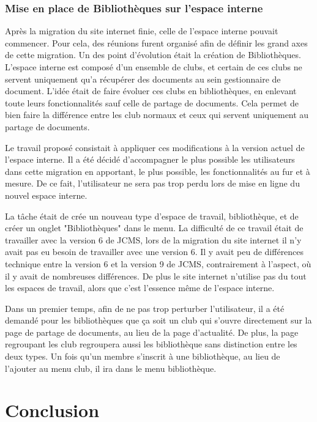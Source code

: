 \documentclass[12pt,a4paper]{article}
\begin{document}
\subsubsection{Mise en place de Bibliothèques sur l'espace interne}
Après la migration du site internet finie, celle de l'espace interne pouvait commencer. Pour cela, des réunions furent organisé afin de définir les grand axes de cette migration. Un des point d'évolution était la création de Bibliothèques. L'espace interne est composé d'un ensemble de clubs, et certain de ces clubs ne servent uniquement qu'a récupérer des documents au sein gestionnaire de document. L'idée était de faire évoluer ces clubs en bibliothèques, en enlevant toute leurs fonctionnalités sauf celle de partage de documents. Cela permet de bien faire la différence entre les club normaux et ceux qui servent uniquement au partage de documents.\par 
Le travail proposé consistait à appliquer ces modifications à la version actuel de l'espace interne. Il a été décidé d'accompagner le plus possible les utilisateurs dans cette migration en apportant, le plus possible, les fonctionnalités au fur et à mesure. De ce fait, l'utilisateur ne sera pas trop perdu lors de mise en ligne du nouvel espace interne.\par 
La tâche était de crée un nouveau type d'espace de travail, bibliothèque, et de créer un onglet "Bibliothèques" dans le menu. La difficulté de ce travail était de travailler avec la version 6 de JCMS, lors de la migration du site internet il n'y avait pas eu besoin de travailler avec une version 6. Il y avait peu de différences technique entre la version 6 et la version 9 de JCMS, contrairement à l'aspect, où il y avait de nombreuses différences. De plus le site internet n'utilise pas du tout les espaces de travail, alors que c'est l'essence même de l'espace interne.\par 
Dans un premier temps, afin de ne pas trop perturber l'utilisateur, il a été demandé pour les bibliothèques que ça soit un club qui s'ouvre directement sur la page de partage de documents, au lieu de la page d'actualité. De plus, la page regroupant les club regroupera aussi les bibliothèque sans distinction entre les deux types. Un fois qu'un membre s'inscrit à une bibliothèque, au lieu de l'ajouter au menu club, il ira dans le menu bibliothèque.\par

\newpage
\section{Conclusion}

\newpage
\listoffigures
\end{document}
